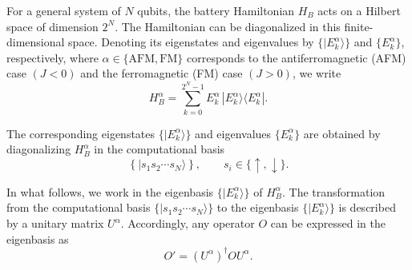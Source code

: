 \documentclass[aps,superscriptaddress,twocolumn,pre,longbibliography,floatfix]{revtex4-1}
\begin{document}
	
	For a general system of $N$ qubits, the battery Hamiltonian $H_B$ acts on a Hilbert space of dimension $2^N$. The Hamiltonian can be diagonalized in this finite-dimensional space. Denoting its eigenstates and eigenvalues by $\{|E_k^{\alpha}\rangle\}$ and $\{E_k^{\alpha}\}$, respectively, where $\alpha \in \{\mathrm{AFM}, \mathrm{FM}\}$ corresponds to the antiferromagnetic (AFM) case $(J<0)$ and the ferromagnetic (FM) case $(J>0)$, we write
	\begin{equation}\label{Diagonalized_Hamiltonian}
		H_B^{\alpha} = \sum_{k=0}^{2^N -1} E_k^{\alpha} \, |E_k^{\alpha}\rangle \langle E_k^{\alpha}|.
	\end{equation}
	
	The corresponding eigenstates $\{|E_k^{\alpha}\rangle\}$ and eigenvalues $\{E_k^{\alpha}\}$ are obtained by diagonalizing $H_B^{\alpha}$ in the computational basis
	\begin{equation}
		\left\{ |s_1 s_2 \cdots s_N\rangle \right\},
		\qquad s_i \in \{\uparrow,\downarrow\}.
	\end{equation}
	
	In what follows, we work in the eigenbasis $\{|E_k^{\alpha}\rangle\}$ of $H_B^{\alpha}$. The transformation from the computational basis $\{|s_1 s_2 \cdots s_N\rangle\}$ to the eigenbasis $\{|E_k^{\alpha}\rangle\}$ is described by a unitary matrix $U^{\alpha}$. Accordingly, any operator $O$ can be expressed in the eigenbasis as
	\begin{equation}
		O' = \left(U^{\alpha}\right)^{\dagger} O U^{\alpha}.
	\end{equation}
	
	
	
	
\end{document}

